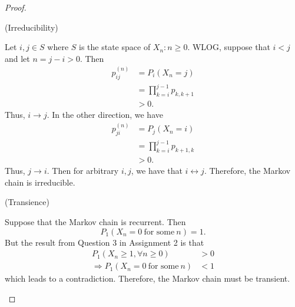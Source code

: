 \documentclass[
  coursecode={MTHE 455},
  assignmentname={Assignment \assignmentnumber},
  studentnumber=20053722,
  name={Bryan Hoang},
  draft,
]{
  ltxanswer%
}
\begin{document}
  \begin{questions}
    \setcounter{question}{\questionnumber}
    \addtocounter{question}{-1}
    \question[4]{}
    \begin{solution}
      \begin{proof}
        \begin{proofpart}
          (Irreducibility)

          Let \(i,j\in S\) where \(S\) is the state space of \(X_{n}:n\ge0\). WLOG, suppose that \(i<j\) and let \(n=j-i>0\). Then
          \begin{align*}
            p_{ij}^{(n)} &= P_{i}(X_{n}=j)              \\
                         &= \prod_{k=i}^{j-1} p_{k,k+1} \\
                         &> 0.
          \end{align*}
          Thus, \(i \to j\). In the other direction, we have
          \begin{align*}
            p_{ji}^{(n)} &= P_{j}(X_{n}=i)              \\
                         &= \prod_{k=i}^{j-1} p_{k+1,k} \\
                         &> 0.
          \end{align*}
          Thus, \(j \to i\). Then for arbitrary \(i,j\), we have that \(i \leftrightarrow j\). Therefore, the Markov chain is irreducible.
        \end{proofpart}
        \begin{proofpart}
          (Transience)

          Suppose that the Markov chain is recurrent. Then
          \begin{equation*}
            P_{1}(X_{n}=0\ \text{for some}\ n) = 1.
          \end{equation*}
          But the result from Question 3 in Assignment 2 is that
          \begin{align*}
            P_{1}(X_{n}\ge1, \forall n\ge0)                &> 0 \\
            \Rightarrow P_{1}(X_{n}=0\ \text{for some}\ n) &< 1
          \end{align*}
          which leads to a contradiction. Therefore, the Markov chain must be transient.
        \end{proofpart}
      \end{proof}
    \end{solution}
  \end{questions}
\end{document}
